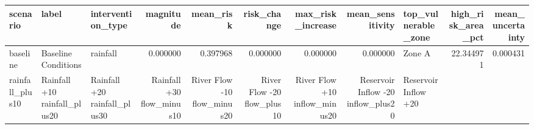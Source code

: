 \begin{tabular}{lllrrrrrlrr}
\toprule
scenario & label & intervention_type & magnitude & mean_risk & risk_change & max_risk_increase & mean_sensitivity & top_vulnerable_zone & high_risk_area_pct & mean_uncertainty \\
\midrule
baseline & Baseline Conditions & rainfall & 0.000000 & 0.397968 & 0.000000 & 0.000000 & 0.000000 & Zone A & 22.344971 & 0.000431 \\
rainfall_plus10 & Rainfall +10%
rainfall_plus20 & Rainfall +20%
rainfall_plus30 & Rainfall +30%
flow_minus10 & River Flow -10%
flow_minus20 & River Flow -20%
flow_plus10 & River Flow +10%
inflow_minus20 & Reservoir Inflow -20%
inflow_plus20 & Reservoir Inflow +20%
\bottomrule
\end{tabular}
